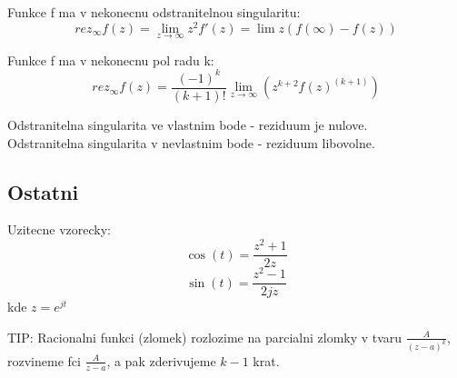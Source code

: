Funkce f ma v nekonecnu odstranitelnou singularitu:
\begin{equation}
\label{eq:rez_nek_ods}
rez_\infty f(z) = \lim_{z \to \infty} z^2 f'(z) = \lim z(f(\infty) - f(z))
\end{equation}

Funkce f ma v nekonecnu pol radu k:
\begin{equation}
\label{eq:rez_nek_polk}
rez_\infty f(z) = \frac{(-1)^k}{(k+1)!}\lim_{z \to \infty} (z^{k+2} f(z)^{(k+1)})
\end{equation}

Odstranitelna singularita ve vlastnim bode - reziduum je nulove.\\
Odstranitelna singularita v nevlastnim bode - reziduum libovolne.\\


\subsection*{Ostatni}
Uzitecne vzorecky:
$$\operatorname{cos}(t) = \frac{z^2+1}{2z}$$
$$\operatorname{sin}(t) = \frac{z^2-1}{2jz}$$
kde $z = e^{jt}$

TIP: Racionalni funkci (zlomek) rozlozime na parcialni zlomky v tvaru $\frac{A}{(z-a)^k}$, rozvineme fci $\frac{A}{z-a}$, a pak zderivujeme $k-1$ krat.

